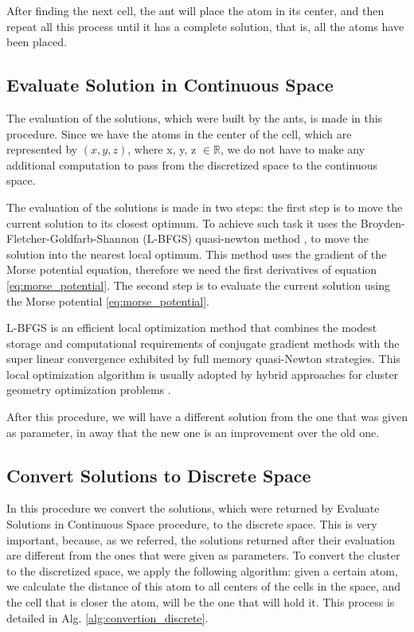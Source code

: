 			After finding the next cell, the ant will place the atom in its center, and then repeat all this process until it has a complete solution, that is, all the atoms have been placed.
			
			\subsection{Evaluate Solution in Continuous Space}
			
			The evaluation of the solutions, which were built by the ants, is made in this procedure. Since we have the atoms in the center of the cell, which are represented by $(x,y,z)$, where x, y, z $\in \mathbb{R}$, we do not have to make any additional computation to pass from the discretized space to the continuous space.

			The evaluation of the solutions is made in two steps: the first step is to move the current solution to its closest optimum. To achieve such task it uses the Broyden-Fletcher-Goldfarb-Shannon (L-BFGS) quasi-newton method \cite{liu89}, to move the solution into the nearest local optimum. This method uses the gradient of the Morse potential equation, therefore we need the first derivatives of equation \ref{eq:morse_potential}. The second step is to evaluate the current solution using the Morse potential \ref{eq:morse_potential}.

			L-BFGS is an efficient local optimization method that combines the modest storage and computational requirements of conjugate gradient methods with the super linear convergence exhibited by full memory quasi-Newton strategies. This local optimization algorithm is usually adopted by hybrid approaches for cluster geometry optimization problems \cite{grosso07, xico09}.

			After this procedure, we will have a different solution from the one that was given as parameter, in away that the new one is an improvement over the old one.
			
			\subsection{Convert Solutions to Discrete Space}
			In this procedure we convert the solutions, which were returned by Evaluate Solutions in Continuous Space procedure, to the discrete space. This is very important, because, as we referred, the solutions returned after their evaluation are different from the ones that were given as parameters.
			To convert the cluster to the discretized space, we apply the following algorithm: given a certain atom, we calculate the distance of this atom to all centers of the cells in the space, and the cell that is closer the atom, will be the one that will hold it. This process is detailed in Alg. \ref{alg:convertion_discrete}.
			
